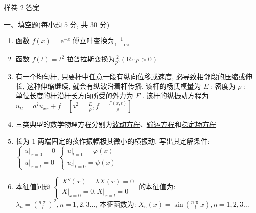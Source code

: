 \documentclass{article}
\theoremstyle{nonumberplain}
\newcommand{\ee}{\mathrm{e}}
\newcommand{\ii}{\,\mathrm{i}\,}
\begin{document}
    \newpage
    \begin{center}
    	 样卷 $2$ 答案
    \end{center}
    \begin{flushleft}
    	一、填空题(每小题 $5$ 分, 共 $30$ 分)
    \end{flushleft}
    \begin{enumerate}
    	\item 函数 $f(x)=\ee^{-x}$ 傅立叶变换为\underline{\hspace{1pc}$\frac{1}{1+\ii\omega}$\hspace{1pc}}
    	
    	\item 函数 $f(t)=t^2$ 拉普拉斯变换为\underline{\hspace{1pc}$\frac{2}{p^3}(\mathrm{Re}\, p>0)$\hspace{1pc}}
    	
    	\item 有一个均匀杆, 只要杆中任意一段有纵向位移或速度, 必导致相邻段的压缩或伸长, 这种伸缩继续, 就会有纵波沿着杆传播. 该杆的杨氏模量为 $E$ ; 密度为 $\rho$ ; 单位长度的杆沿杆长方向所受的外力为 $F$ . 该杆的纵振动方程为\underline{\hspace{1pc}$u_{tt}=a^2 u_{xx}+f\quad\left[ a^2=\frac{E}{\rho},f=\frac{F(x,t)}{\rho} \right]$\hspace{1pc}}
    	
    	\item 三类典型的数学物理方程分别为\underline{\hspace{1pc}波动方程\hspace{1pc}}、\underline{\hspace{1pc}输运方程\hspace{1pc}}和\underline{\hspace{1pc}稳定场方程\hspace{1pc}}
    	
    	\item 长为 $1$ 两端固定的弦作振幅极其微小的横振动, 写出其定解条件: \underline{\hspace{1pc}$\begin{cases}
    		u|_{x=0}=0\\
    		u|_{x=l}=0
    		\end{cases}\begin{cases}
    		u|_{t=0}=\varphi(x)\\
    		u_{t}|_{t=0}=\psi(x)
    		\end{cases}$}
    	
    	\item 本征值问题 $\begin{cases}
    	X''(x)+\lambda X(x)=0\\
    	\left. X \right|_{x=0}=0,\left. X \right|_{x=l}=0
    	\end{cases}$ 的本征值为: \underline{\hspace{1pc}$\lambda_{n}=\left( \frac{n\uppi}{l} \right)^2,n=1,2,3\ldots$\hspace{1pc}}, 本征函数为: \underline{\hspace{1pc}$X_{n}(x)=\sin\left( \frac{n\uppi}{l}x \right),n=1,2,3\ldots$\hspace{1pc}}
    \end{enumerate}
    
\end{document}

